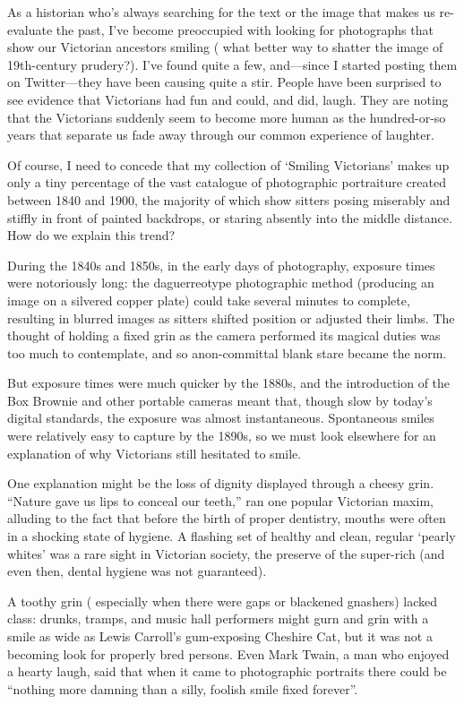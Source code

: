 As a historian who's always searching for the text or the image that makes us re-evaluate the past, I've become preoccupied with looking for photographs that show our Victorian ancestors smiling ( what better way to shatter the image of 19th-century prudery?). I've found quite a few, and—since I started posting them on Twitter—they have been causing quite a stir. People have been surprised to see evidence that Victorians had fun and could, and did, laugh. They are noting that the Victorians suddenly seem to become more human as the hundred-or-so years that separate us fade away through our common experience of laughter.


Of course, I need to concede that my collection of `Smiling Victorians' makes up only a tiny percentage of the vast catalogue of photographic portraiture created between 1840 and 1900, the majority of which show sitters posing miserably and stiffly in front of painted backdrops, or staring absently into the middle distance. How do we explain this trend?


During the 1840s and 1850s, in the early days of photography, exposure times were notoriously long: the daguerreotype photographic method (producing an image on a silvered copper plate) could take several minutes to complete, resulting in blurred images as sitters shifted position or adjusted their limbs. The thought of holding a fixed grin as the camera performed its magical duties was too much to contemplate, and so anon-committal blank stare became the norm.


But exposure times were much quicker by the 1880s, and the introduction of the Box Brownie and other portable cameras meant that, though slow by today's digital standards, the exposure was almost instantaneous. Spontaneous smiles were relatively easy to capture by the 1890s, so we must look elsewhere for an explanation of why Victorians still hesitated to smile.


One explanation might be the loss of dignity displayed through a cheesy grin. ``Nature gave us lips to conceal our teeth,'' ran one popular Victorian maxim, alluding to the fact that before the birth of proper dentistry, mouths were often in a shocking state of hygiene. A flashing set of healthy and clean, regular `pearly whites' was a rare sight in Victorian society, the preserve of the super-rich (and even then, dental hygiene was not guaranteed).


A toothy grin ( especially when there were gaps or blackened gnashers) lacked class: drunks, tramps, and music hall performers might gurn and grin with a smile as wide as Lewis Carroll's gum-exposing Cheshire Cat, but it was not a becoming look for properly bred persons. Even Mark Twain, a man who enjoyed a hearty laugh, said that when it came to photographic portraits there could be ``nothing more damning than a silly, foolish smile fixed forever''.